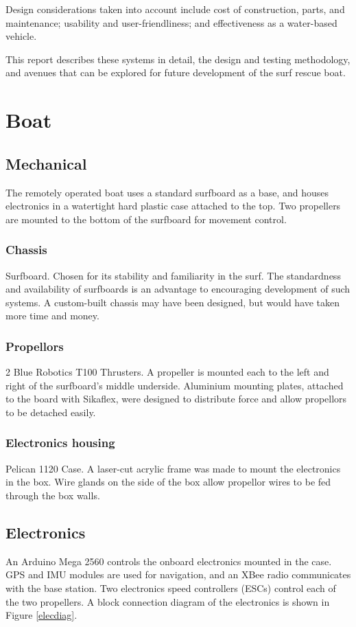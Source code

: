 \documentclass[a4paper]{IEEEtran}
\begin{document}
Design considerations taken into account include cost of construction, parts, and maintenance; usability and user-friendliness; and effectiveness as a water-based vehicle.

This report describes these systems in detail, the design and testing methodology, and avenues that can be explored for future development of the surf rescue boat.

\section{Boat}

\subsection{Mechanical}
The remotely operated boat uses a standard surfboard as a base, and houses electronics in a watertight hard plastic case attached to the top. Two propellers are mounted to the bottom of the surfboard for movement control.

\subsubsection{Chassis}
Surfboard. Chosen for its stability and familiarity in the surf. The standardness and availability of surfboards is an advantage to encouraging development of such systems. A custom-built chassis may have been designed, but would have taken more time and money. 

\subsubsection{Propellors}
2 Blue Robotics T100 Thrusters. A propeller is mounted each to the left and right of the surfboard's middle underside. Aluminium mounting plates, attached to the board with Sikaflex, were designed to distribute force and allow propellors to be detached easily.

\subsubsection{Electronics housing}
Pelican 1120 Case. A laser-cut acrylic frame was made to mount the electronics in the box. Wire glands on the side of the box allow propellor wires to be fed through the box walls.

\subsection{Electronics}
An Arduino Mega 2560 controls the onboard electronics mounted in the case. GPS and IMU modules are used for navigation, and an XBee radio communicates with the base station. Two electronics speed controllers (ESCs) control each of the two propellers. A block connection diagram of the electronics is shown in Figure \ref{elecdiag}.
\end{document}
